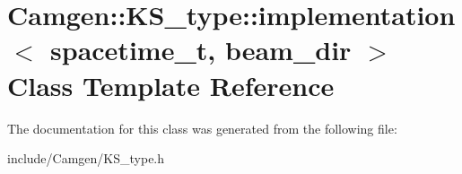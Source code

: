 \hypertarget{a00290}{\section{Camgen\-:\-:K\-S\-\_\-type\-:\-:implementation$<$ spacetime\-\_\-t, beam\-\_\-dir $>$ Class Template Reference}
\label{a00290}
}


The documentation for this class was generated from the following file\-:\begin{DoxyCompactItemize}
\item 
include/\-Camgen/K\-S\-\_\-type.\-h\end{DoxyCompactItemize}
